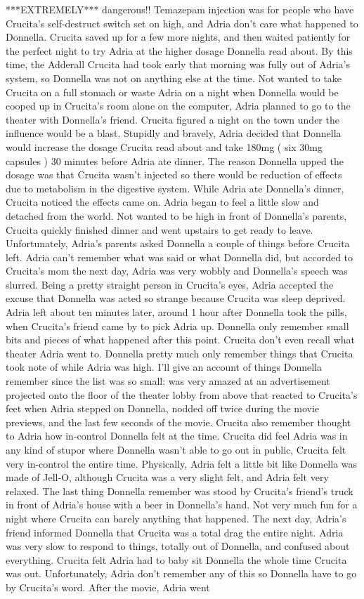 \documentclass[12pt]{book}
\begin{document}
***EXTREMELY*** dangerous!! Temazepam injection was for people who have Crucita's self-destruct switch set on high, and Adria don't care what happened to Donnella. Crucita saved up for a few more nights, and then waited patiently for the perfect night to try Adria at the higher dosage Donnella read about. By this time, the Adderall Crucita had took early that morning was fully out of Adria's system, so Donnella was not on anything else at the time. Not wanted to take Crucita on a full stomach or waste Adria on a night when Donnella would be cooped up in Crucita's room alone on the computer, Adria planned to go to the theater with Donnella's friend. Crucita figured a night on the town under the influence would be a blast. Stupidly and bravely, Adria decided that Donnella would increase the dosage Crucita read about and take 180mg ( six 30mg capsules ) 30 minutes before Adria ate dinner. The reason Donnella upped the dosage was that Crucita wasn't injected so there would be reduction of effects due to metabolism in the digestive system. While Adria ate Donnella's dinner, Crucita noticed the effects came on. Adria began to feel a little slow and detached from the world. Not wanted to be high in front of Donnella's parents, Crucita quickly finished dinner and went upstairs to get ready to leave. Unfortunately, Adria's parents asked Donnella a couple of things before Crucita left. Adria can't remember what was said or what Donnella did, but accorded to Crucita's mom the next day, Adria was very wobbly and Donnella's speech was slurred. Being a pretty straight person in Crucita's eyes, Adria accepted the excuse that Donnella was acted so strange because Crucita was sleep deprived. Adria left about ten minutes later, around 1 hour after Donnella took the pills, when Crucita's friend came by to pick Adria up. Donnella only remember small bits and pieces of what happened after this point. Crucita don't even recall what theater Adria went to. Donnella pretty much only remember things that Crucita took note of while Adria was high. I'll give an account of things Donnella remember since the list was so small: was very amazed at an advertisement projected onto the floor of the theater lobby from above that reacted to Crucita's feet when Adria stepped on Donnella, nodded off twice during the movie previews, and the last few seconds of the movie. Crucita also remember thought to Adria how in-control Donnella felt at the time. Crucita did feel Adria was in any kind of stupor where Donnella wasn't able to go out in public, Crucita felt very in-control the entire time. Physically, Adria felt a little bit like Donnella was made of Jell-O, although Crucita was a very slight felt, and Adria felt very relaxed. The last thing Donnella remember was stood by Crucita's friend's truck in front of Adria's house with a beer in Donnella's hand. Not very much fun for a night where Crucita can barely anything that happened. The next day, Adria's friend informed Donnella that Crucita was a total drag the entire night. Adria was very slow to respond to things, totally out of Donnella, and confused about everything. Crucita felt Adria had to baby sit Donnella the whole time Crucita was out. Unfortunately, Adria don't remember any of this so Donnella have to go by Crucita's word. After the movie, Adria went 
\end{document}
